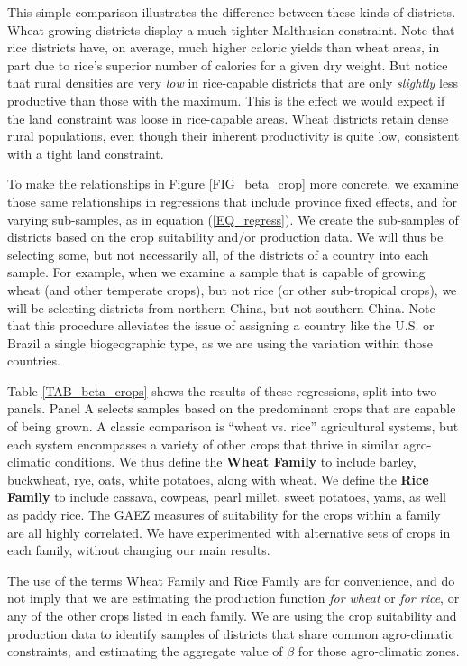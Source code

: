 \documentclass[11pt]{article}
\begin{document}
This simple comparison illustrates the difference between these kinds of districts. Wheat-growing districts display a much tighter Malthusian constraint. Note that rice districts have, on average, much higher caloric yields than wheat areas, in part due to rice's superior number of calories for a given dry weight. But notice that rural densities are very \textit{low} in rice-capable districts that are only \textit{slightly} less productive than those with the maximum. This is the effect we would expect if the land constraint was loose in rice-capable areas. Wheat districts retain dense rural populations, even though their inherent productivity is quite low, consistent with a tight land constraint.

To make the relationships in Figure \ref{FIG_beta_crop} more concrete, we examine those same relationships in regressions that include province fixed effects, and for varying sub-samples, as in equation (\ref{EQ_regress}). We create the sub-samples of districts based on the crop suitability and/or production data. We will thus be selecting some, but not necessarily all, of the districts of a country into each sample. For example, when we examine a sample that is capable of growing wheat (and other temperate crops), but not rice (or other sub-tropical crops), we will be selecting districts from northern China, but not southern China. Note that this procedure alleviates the issue of assigning a country like the U.S. or Brazil a single biogeographic type, as we are using the variation within those countries.

Table \ref{TAB_beta_crops} shows the results of these regressions, split into two panels. Panel A selects samples based on the predominant crops that are capable of being grown. A classic comparison is ``wheat vs. rice'' agricultural systems, but each system encompasses a variety of other crops that thrive in similar agro-climatic conditions. We thus define the \textbf{Wheat Family} to include barley, buckwheat, rye, oats, white potatoes, along with wheat. We define the \textbf{Rice Family} to include cassava, cowpeas, pearl millet, sweet potatoes, yams, as well as paddy rice. The GAEZ measures of suitability for the crops within a family are all highly correlated. We have experimented with alternative sets of crops in each family, without changing our main results. 

The use of the terms Wheat Family and Rice Family are for convenience, and do not imply that we are estimating the production function \textit{for wheat} or \textit{for rice}, or any of the other crops listed in each family. We are using the crop suitability and production data to identify samples of districts that share common agro-climatic constraints, and estimating the aggregate value of $\beta$ for those agro-climatic zones.
\end{document}
